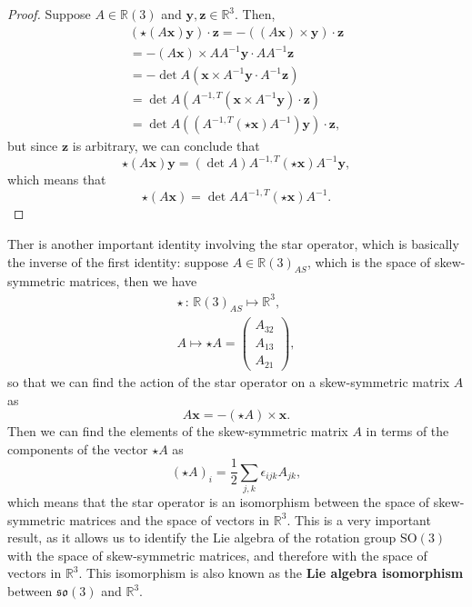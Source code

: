 \begin{proof}
    Suppose \(A \in \mathbb{R}(3)\) and \(\mathbf{y}, \mathbf{z} \in \mathbb{R}^3\). Then,
    \[
        \begin{aligned}
            (\star (A \mathbf{x}) \mathbf{y}) \cdot \mathbf{z} = - ((A \mathbf{x}) \times \mathbf{y}) \cdot \mathbf{z} \\
            = - (A \mathbf{x}) \times A A^{-1} \mathbf{y} \cdot A A^{-1} \mathbf{z}                                    \\
            = - \det A (\mathbf{x} \times A^{-1} \mathbf{y} \cdot A^{-1} \mathbf{z})                                   \\
            = \det A (A^{-1,T} (\mathbf{x} \times A^{-1} \mathbf{y}) \cdot \mathbf{z})                                 \\
            = \det A ((A^{-1,T} (\star \mathbf{x}) A^{-1}) \mathbf{y}) \cdot \mathbf{z},
        \end{aligned}
    \]
    but since \(\mathbf{z}\) is arbitrary, we can conclude that
    \[
        \star (A \mathbf{x}) \mathbf{y} = (\det A) A^{-1,T} (\star \mathbf{x}) A^{-1}\mathbf{y},
    \]
    which means that
    \[
        \star (A \mathbf{x}) = \det A A^{-1,T} (\star \mathbf{x}) A^{-1}.
    \]
\end{proof}

Ther is another important identity involving the star operator, which is basically the inverse of the first identity: suppose \(A \in \mathbb{R}(3)_{AS}\), which is the space of skew-symmetric matrices, then we have
\[
    \begin{aligned}
        \star \, : \, \mathbb{R}(3)_{AS} \mapsto \mathbb{R}^3, \\
        A \mapsto \star A = \begin{pmatrix}
                                A_{32} \\
                                A_{13} \\
                                A_{21}
                            \end{pmatrix},
    \end{aligned}
\]
so that we can find the action of the star operator on a skew-symmetric matrix \(A\) as
\[
    A \mathbf{x} = - (\star A) \times \mathbf{x}.
\]
Then we can find the elements of the skew-symmetric matrix \(A\) in terms of the components of the vector \(\star A\) as
\[
    (\star A)_{i} = \frac{1}{2} \sum_{j, k} \epsilon_{ijk} A_{jk},
\]
which means that the star operator is an isomorphism between the space of skew-symmetric matrices and the space of vectors in \(\mathbb{R}^3\). This is a very important result, as it allows us to identify the Lie algebra of the rotation group \(\mathrm{SO}(3)\) with the space of skew-symmetric matrices, and therefore with the space of vectors in \(\mathbb{R}^3\). This isomorphism is also known as the \textbf{Lie algebra isomorphism} between \(\mathfrak{so}(3)\) and \(\mathbb{R}^3\).

